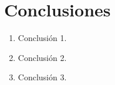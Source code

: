 
\chapter{Conclusiones}
\label{conclusiones}

\begin{enumerate}[label=\destacado{\arabic*.}]
  \setlength\itemsep{1em}
  \item Conclusión 1.

  \item Conclusión 2.

  \item Conclusión 3.
\end{enumerate}
